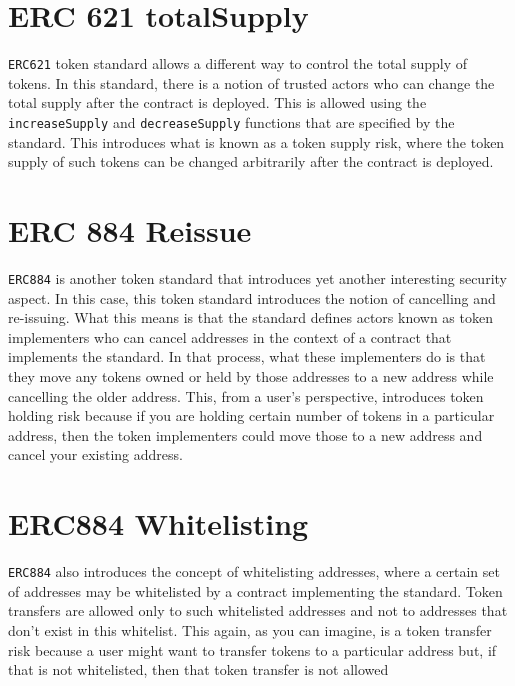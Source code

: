 \section{ERC 621 totalSupply}
\verb|ERC621| token standard allows a different way to control the total supply of tokens. In this standard, there is a notion of trusted actors who can change the total supply after the contract is deployed. This is allowed using the \verb|increaseSupply| and \verb|decreaseSupply| functions that are specified by the standard. This introduces what is known as a token supply risk, where the token supply of such tokens can be changed arbitrarily after the contract is deployed.

\section{ERC 884 Reissue}
\verb|ERC884| is another token standard that introduces yet another interesting security aspect. In this case, this token standard introduces the notion of cancelling and re-issuing. What this means is that the standard defines actors known as token implementers who can cancel addresses in the context of a contract that implements the standard. In that process, what these implementers do is that they move any tokens owned or held by those addresses to a new address while cancelling the older address. This, from a user's perspective, introduces token holding risk because if you are holding certain number of tokens in a particular address, then the token implementers could move those to a new address and cancel your existing address.

\section{ERC884 Whitelisting}
\verb|ERC884| also introduces the concept of whitelisting addresses, where a certain set of addresses may be whitelisted by a contract implementing the standard. Token transfers are allowed only to such whitelisted addresses and not to addresses that don't exist in this whitelist. This again, as you can imagine, is a token transfer risk because a user might want to transfer tokens to a particular address but, if that is not whitelisted, then that token transfer is not allowed 

